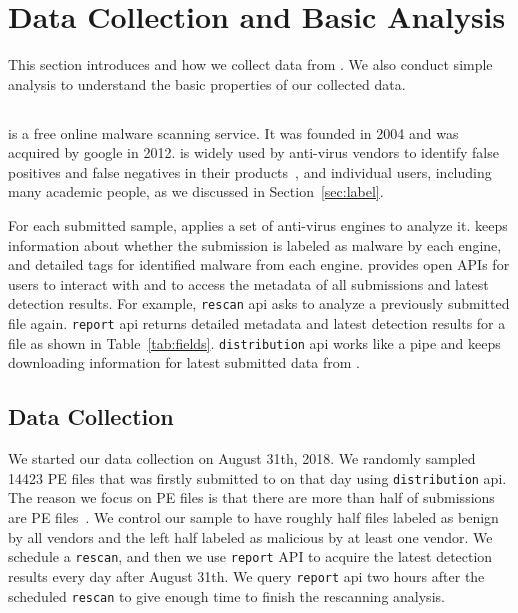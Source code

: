 \section{Data Collection and Basic Analysis}
\label{sec:data}



This section introduces \vt{} and how we collect data from \vt{}. 
We also conduct simple analysis to understand 
the basic properties of our collected data. 

\subsection{\vt{}}
\vt{} is a free online malware scanning service. 
It was founded in 2004 and was acquired by google in 2012. 
\vt{} is widely used by anti-virus vendors to identify false positives and false negatives 
in their products~\cite{huangvt2016bigdata, neeles}, 
and individual users, including many academic people, 
as we discussed in Section~\ref{sec:label}.

For each submitted sample, \vt{} applies a set of anti-virus engines to analyze it. 
\vt{} keeps information about whether the submission is labeled as malware by each engine, 
and detailed tags for identified malware from each engine. 
\vt{} provides open APIs for users to interact with \vt{} 
and to access the metadata of all submissions and latest detection results.
For example, \texttt{rescan} api asks \vt{} to analyze a previously submitted file again. 
\texttt{report} api returns detailed metadata and latest 
detection results for a file as shown in Table~\ref{tab:fields}. 
\texttt{distribution} api works like a pipe and keeps 
downloading information for latest submitted data from \vt{}. 

\subsection{Data Collection}

We started our data collection on August 31th, 2018. 
We randomly sampled 14423 PE files that was firstly submitted to \vt{} 
on that day using \texttt{distribution} api.
The reason we focus on PE files is that there are more 
than half of \vt{} submissions are PE files~\cite{SongAPsys2016}. 
We control our sample to have roughly 
half files labeled as benign by all vendors 
and the left half labeled as malicious by at least one vendor.
We schedule a \texttt{rescan}, and then we use \texttt{report} API to acquire
the latest detection results every day after August 31th. 
We query \texttt{report} api two hours after the scheduled \texttt{rescan} to give 
\vt{} enough time to finish the rescanning analysis. 

